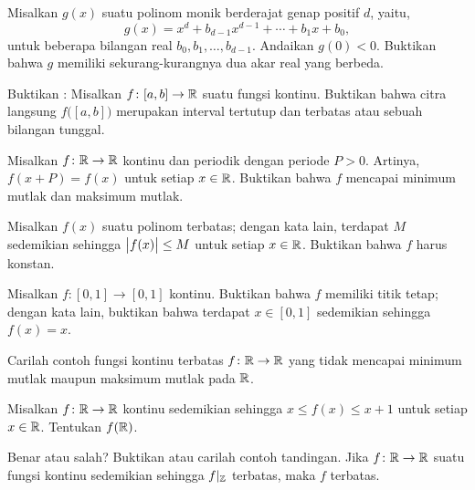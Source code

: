\begin{exercise}
Misalkan $g(x)$ suatu polinom monik berderajat genap positif $d$, yaitu,
\begin{equation*}
g(x) = x^d + b_{d-1} x^{d-1} + \cdots + b_1 x + b_0 ,
\end{equation*}
untuk beberapa bilangan real $b_{0}, b_1, \ldots, b_{d-1}$.  Andaikan
$g(0) < 0$.  Buktikan bahwa $g$ memiliki sekurang-kurangnya dua akar real yang berbeda.
\end{exercise}

\begin{exercise}
Buktikan :
Misalkan $f \colon [a,b] \to {\mathbb{R}}$ suatu fungsi kontinu.  Buktikan
bahwa citra langsung $f\bigl([a,b]\bigr)$ merupakan interval tertutup dan terbatas atau
sebuah bilangan tunggal.
\end{exercise}

\begin{exercise}
Misalkan $f \colon {\mathbb{R}} \to {\mathbb{R}}$ kontinu dan periodik dengan periode
$P > 0$.  Artinya, $f(x+P) = f(x)$ untuk setiap $x \in {\mathbb{R}}$.  Buktikan bahwa $f$
mencapai minimum mutlak dan maksimum mutlak.
\end{exercise}

\begin{exercise}[Menantang]
Misalkan $f(x)$ suatu polinom terbatas;
dengan kata lain, terdapat $M$ sedemikian sehingga $\bigl\lvert {f(x)} \bigr\rvert \leq M$
untuk setiap $x \in {\mathbb{R}}$.  Buktikan bahwa $f$ harus konstan.
\end{exercise}

\begin{exercise}
Misalkan $f \colon [0,1] \to [0,1]$ kontinu.  Buktikan bahwa $f$
memiliki titik tetap; dengan kata lain, buktikan bahwa terdapat $x \in [0,1]$ sedemikian sehingga
$f(x) = x$.
\end{exercise}

\begin{exercise}
Carilah contoh fungsi kontinu terbatas $f \colon {\mathbb{R}} \to {\mathbb{R}}$ yang
tidak mencapai minimum mutlak maupun maksimum mutlak pada ${\mathbb{R}}$.
\end{exercise}

\begin{exercise}
Misalkan $f \colon {\mathbb{R}} \to {\mathbb{R}}$ kontinu sedemikian sehingga
$x \leq f(x) \leq x+1$ untuk setiap $x \in {\mathbb{R}}$.  Tentukan $f({\mathbb{R}})$.
\end{exercise}

\begin{exercise}
Benar atau salah? Buktikan atau carilah contoh tandingan.  Jika $f \colon {\mathbb{R}} \to
{\mathbb{R}}$ suatu fungsi kontinu sedemikian sehingga $f|_{{\mathbb{Z}}}$ terbatas, maka $f$
terbatas.
\end{exercise}

